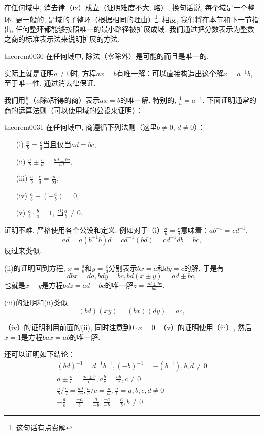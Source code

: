 在任何域中, 消去律（ix）成立（证明难度不大, 略）, 换句话说, 每个域是一个整环. 更一般的, 是域的子整环（根据相同的理由）\footnote{这句话有点费解}. 相反, 我们将在本节和下一节指出, 任何整环都能够按照唯一的最小路径被扩展成域. 我们通过把分数表示为整数之商的标准表示法来说明扩展的方法. 
\begin{theorem}{}{theorem0030}
在任何域中, 除法（零除外）是可能的而且是唯一的. 
\end{theorem}
实际上就是证明$a \neq 0$时, 方程$ax=b$有唯一解：可以直接构造出这个解$x=a^{-1}b$, 至于唯一性, 通过消去律保证. 

我们用$\frac{b}{a}$（$a$除$b$所得的商）表示$ax=b$的唯一解, 特别的, $\frac{1}{a}=a^{-1}$. 下面证明通常的商的运算法则（可以使用域的公设来证明）：
\begin{theorem}{}{theorem0031}
在任何域中, 商遵循下列法则（这里$b \neq 0$, $d \neq 0$）：
\begin{enumerate}
\item[(i)] $\frac{a}{b}=\frac{c}{d}$当且仅当$ad=bc$, 
\item[(ii)] $\frac{a}{b} \pm \frac{c}{d} = \frac{ad \pm bc}{bd}$, 
\item[(iii)] $\frac{a}{b} \cdot \frac{c}{d} = \frac{ac}{bd}$, 
\item[(iv)] $\frac{a}{b} + (-\frac{a}{b}) = 0$, 
\item[(v)] $\frac{a}{b} \cdot \frac{b}{a} = 1$, 当$\frac{a}{b}\neq 0$. 
\end{enumerate}
\end{theorem}

证明不难, 严格使用各个公设和定义. 例如对于（i）$\frac{a}{b} = \frac{c}{d}$意味着：$ab^{-1}=cd^{-1}$. 
\[
ad = a(b^{-1}b)d = cd^{-1}(bd) = cd^{-1}db=bc,
\]
反过来类似. 

(ii)的证明回到方程, $x=\frac{a}{b}$和$y=\frac{c}{d}$分别表示$bx=a$和$dy=c$的解, 于是有
\[
dbx=da, bdy=bc, bd(x \pm y) = ad \pm bc,
\]
也就是$x \pm y$是方程$bdz = ad \pm bc$的唯一解$z = \frac{ad \pm bc}{bd}$. 

(iii)的证明和(ii)类似
\[
(bd)(xy) = (bx)(dy)=ac,
\]

（iv）的证明利用前面的(ii), 同时注意到$0 \cdot x = 0$. （v）的证明使用（iii）, 然后$x=1$是方程$bax = ab$的唯一解. 

还可以证明如下结论：
\begin{gather}
(bd)^{-1} = d^{-1}b^{-1},(-b)^{-1} = -(b^{-1}), b,d \neq 0\\
a \pm\frac{b}{c} = \frac{ac \pm b}{c}, a\frac{b}{c} = \frac{ab}{c}, c \neq 0\\
\frac{a}{b}/\frac{c}{d} = \frac{ad}{bc}, \frac{a}{b}/c = \frac{a}{bc}, \frac{a}{1}=a, b,c,d\neq 0\\
-\frac{a}{b} = \frac{-a}{b} = \frac{a}{-b}, \frac{-a}{-b} = \frac{a}{b}, b \neq 0
\end{gather}

